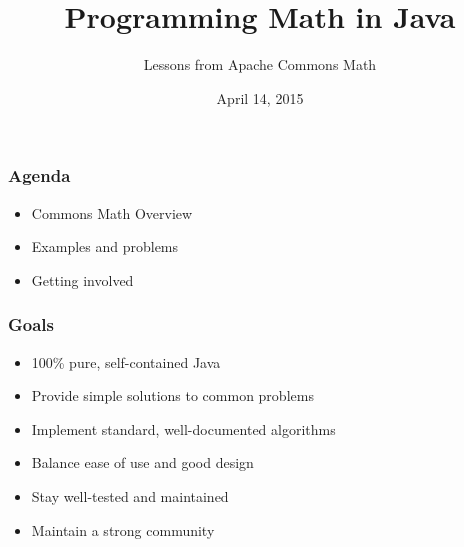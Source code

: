 \documentclass[14pt,mathserif]{beamer}
\title{Programming Math in Java}
\subtitle{Lessons from Apache Commons Math}
\author{
  \newauthor{Phil Steitz}{psteitz@apache.org}
}
\institute[Apachecon North America 2015]{Apachecon North America 2015}
\date{April 14, 2015}
\begin{document}
{
\begin{frame} %
  \titlepage
\end{frame}
}

\begin{frame}
  \frametitle{Agenda}
\begin{itemize}
  \item Commons Math Overview
  \item Examples and problems
  \item Getting involved
\end{itemize}

\end{frame}

\begin{frame}
  \frametitle{Goals}

\begin{itemize}
  \item 100\% pure, self-contained Java
  \item Provide simple solutions to common problems
  \item Implement standard, well-documented algorithms
  \item Balance ease of use and good design
  \item Stay well-tested and maintained
  \item Maintain a strong community
\end{itemize}

\end{frame}
\end{document}
